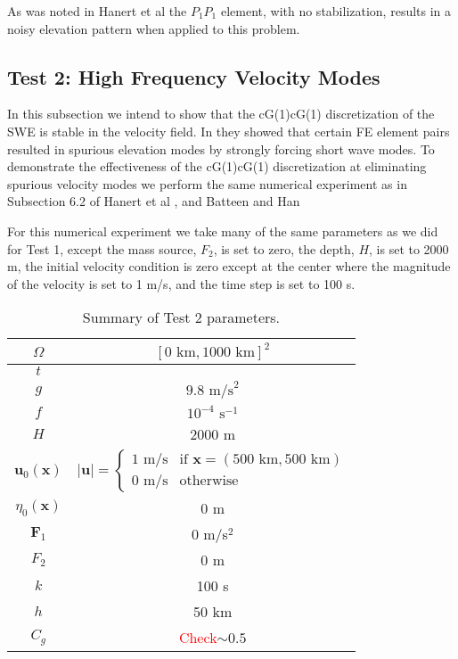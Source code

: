   As was noted in Hanert et al \cite{Hanert2002} the $P_1P_1$ element, with no
  stabilization, results in a noisy elevation pattern when applied to this
  problem. %

\subsection{Test 2: High Frequency Velocity Modes}
  In this subsection we intend to show that the cG(1)cG(1) discretization of the
  SWE is stable in the velocity field. In \cite{Hanert2002} they showed that
  certain FE element pairs resulted in spurious elevation modes by strongly
  forcing short wave modes.  To demonstrate the effectiveness of the cG(1)cG(1)
  discretization at eliminating spurious velocity modes we perform the same
  numerical experiment as in Subsection 6.2 of Hanert et al \cite{Hanert2002},
  and Batteen and Han \cite{Batteen1981}

  For this numerical experiment we take many of the same parameters as we did
  for Test 1, except the mass source, $F_2$, is set to zero, the depth, $H$, is
  set to 2000 m, the initial velocity condition is zero except at the center
  where the magnitude of the velocity is set to 1 m/s, and the time step is set
  to 100 s.
  \def\arraystretch{1.25} %
  \begin{table}[H]
    \begin{center}
      \begin{tabular}{|c|c|}
        \hline
        $\Omega$ & $[0\text{ km}, 1000\text{ km}]^2$ \\ \hline
        $t$ &  \\ \hline
        $g$ & $9.8\text{ m/s}^2$ \\ \hline 
        $f$ & $10^{-4}\text{ s}^{-1}$ \\ \hline
        $H$ & 2000 m \\ \hline
        $\mathbf{u}_0(\mathbf{x})$ & 
          $\left|\mathbf{u}\right| = 
            \begin{cases}
              1\text{ m/s} & \text{if }\mathbf{x}=(500\text{ km}, 500\text{ km}) \\ 
              0\text{ m/s} & \text{otherwise}
            \end{cases}$ \\ \hline
          $\eta_0(\mathbf{x})$ & 0 m \\ \hline
        $\mathbf{F}_1$ & 0 m/s$^2$\\ \hline
        $F_2$ & 0 m\\ \hline
        $k$ & 100 s \\ \hline
        $h$ & 50 km \\ \hline
        $C_g$ & \textcolor{red}{Check}$\sim 0.5$ \\ \hline
      \end{tabular}
      \caption{Summary of Test 2 parameters.}
      \label{tab:HFVelocityParams}
    \end{center}
  \end{table}

